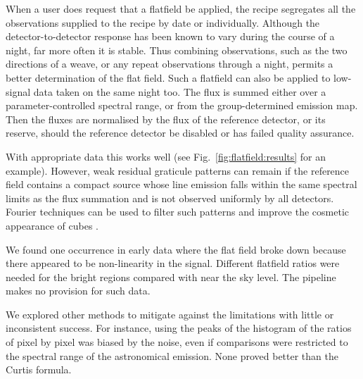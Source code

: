 \documentclass[useAMS,usenatbib]{mn2e}
\begin{document}
When a user does request that a flatfield be applied, the recipe
segregates all the observations supplied to the recipe by date or
individually.  Although the detector-to-detector response has been
known to vary during the course of a night, far more often it is
stable.  Thus combining observations, such as the two directions of a
weave, or any repeat observations through a night, permits a better
determination of the flat field.  Such a flatfield can also be applied
to low-signal data taken on the same night too.  The flux is summed
either over a parameter-controlled spectral range, or from the
group-determined emission map.  Then the fluxes are normalised by the
flux of the reference detector, or its reserve, should the reference
detector be disabled or has failed quality assurance.

With appropriate data this works well (see
Fig.~\ref{fig:flatfield:results} for an example).  However, weak
residual graticule patterns can remain if the reference field contains
a compact source whose line emission falls within the same spectral
limits as the flux summation and is not observed uniformly by all
detectors.  Fourier techniques can be used to filter such patterns and
improve the cosmetic appearance of cubes \citep{2015MNRAS.447.1996W}.

We found one occurrence in early data where the flat field broke down
because there appeared to be non-linearity in the signal.  Different
flatfield ratios were needed for the bright regions compared with near
the sky level.  The pipeline makes no provision for such data.

We explored other methods to mitigate against the limitations with
little or inconsistent success.  For instance, using the peaks of the
histogram of the ratios of pixel by pixel was biased by the noise,
even if comparisons were restricted to the spectral range of the
astronomical emission.  None proved better than the Curtis formula.
\end{document}
